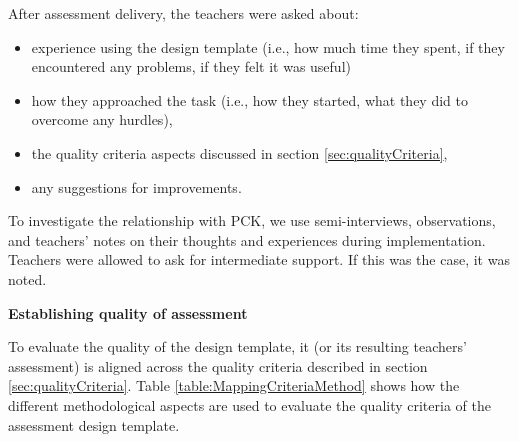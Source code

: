 After assessment delivery, the teachers were asked about:
\begin{itemize}
\item experience using the design template (i.e., how much time they spent, if they encountered any problems, if they felt it was useful)
\item how they approached the task (i.e., how they started, what they did to overcome any hurdles),
\item the quality criteria aspects discussed in section \ref{sec:qualityCriteria},
\item any suggestions for improvements.
\end{itemize}
To investigate the relationship with PCK, we use semi-interviews, observations, and teachers' notes on their thoughts and experiences during implementation. Teachers were allowed to ask for intermediate support. If this was the case, it was noted.


\noindent\textbf{Establishing quality of assessment}\newline

To evaluate the quality of the design template, it (or its resulting teachers' assessment) is aligned across the quality criteria described in section \ref{sec:qualityCriteria}. Table \ref{table:MappingCriteriaMethod} shows how the different methodological aspects are used to evaluate the quality criteria of the assessment design template.





